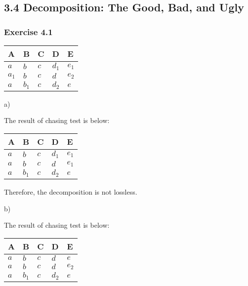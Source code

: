 \documentclass[../../main.tex]{subfiles}
\begin{document}
\subsection*{3.4 Decomposition: The Good, Bad, and Ugly}

\subsubsection*{Exercise 4.1}

\begin{table}[H]
  \centering
  \begin{tabular}{@{}lllll@{}}
  \toprule
  A & B & C & D & E \\ \midrule
  $a$     & $b$      & $c$ & $d_{1}$ & $e_{1}$  \\
  $a_{1}$ & $b$      & $c$ & $d$     & $e_{2}$  \\
  $a$     & $b_{1}$  & $c$ & $d_{2}$ & $e$      \\ \bottomrule
  \end{tabular}
\end{table}

a)

The result of chasing test is below:

\begin{table}[H]
  \centering
  \begin{tabular}{@{}lllll@{}}
  \toprule
  A & B & C & D & E \\ \midrule
  $a$ & $b$      & $c$ & $d_{1}$ & $e_{1}$  \\
  $a$ & $b$      & $c$ & $d$     & $e_{1}$  \\
  $a$ & $b_{1}$  & $c$ & $d_{2}$ & $e$      \\ \bottomrule
  \end{tabular}
\end{table}

Therefore, the decomposition is not lossless.

b)

The result of chasing test is below:

\begin{table}[H]
  \centering
  \begin{tabular}{@{}lllll@{}}
  \toprule
  A & B & C & D & E \\ \midrule
  $a$ & $b$      & $c$ & $d$     & $e$  \\
  $a$ & $b$      & $c$ & $d$     & $e_{2}$  \\
  $a$ & $b_{1}$  & $c$ & $d_{2}$ & $e$      \\ \bottomrule
  \end{tabular}
\end{table}
\end{document}
